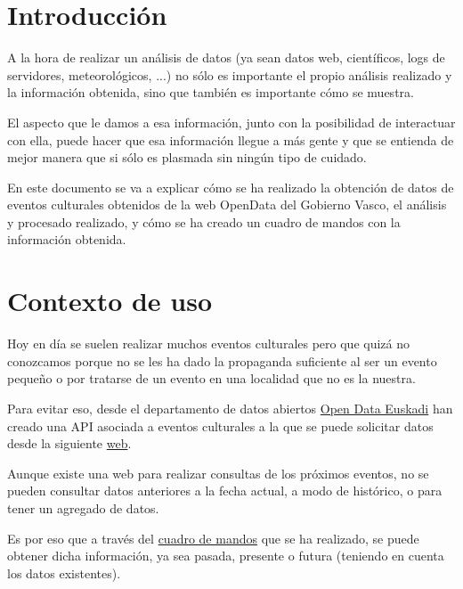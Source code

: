 \documentclass{\ClassPath/viu-tfm-template}
\begin{document}
    \graphicspath{{../../VIU_TFM_LaTeX_template/}}

    \coverpage

    \tableofcontents

\chapter{Introducción}

A la hora de realizar un análisis de datos (ya sean datos web, científicos, logs de servidores, meteorológicos, ...) no sólo es importante el propio análisis realizado y la información obtenida, sino que también es importante cómo se muestra.

El aspecto que le damos a esa información, junto con la posibilidad de interactuar con ella, puede hacer que esa información llegue a más gente y que se entienda de mejor manera que si sólo es plasmada sin ningún tipo de cuidado.

En este documento se va a explicar cómo se ha realizado la obtención de datos de eventos culturales obtenidos de la web OpenData del Gobierno Vasco, el análisis y procesado realizado, y cómo se ha creado un cuadro de mandos con la información obtenida.

\chapter{Contexto de uso}

Hoy en día se suelen realizar muchos eventos culturales pero que quizá no conozcamos porque no se les ha dado la propaganda suficiente al ser un evento pequeño o por tratarse de un evento en una localidad que no es la nuestra.

Para evitar eso, desde el departamento de datos abiertos \href{https://www.opendata.euskadi.eus/inicio/}{Open Data Euskadi} han creado una API asociada a eventos culturales a la que se puede solicitar datos desde la siguiente \href{https://www.opendata.euskadi.eus/api-culture/?api=culture_events}{web}.

Aunque existe una web para realizar consultas de los próximos eventos, no se pueden consultar datos anteriores a la fecha actual, a modo de histórico, o para tener un agregado de datos.

Es por eso que a través del \href{https://datastudio.google.com/reporting/2322c44e-ad75-4243-a4a5-257be6d754bf/page/9AT6C}{cuadro de mandos} que se ha realizado, se puede obtener dicha información, ya sea pasada, presente o futura (teniendo en cuenta los datos existentes).
\end{document}
